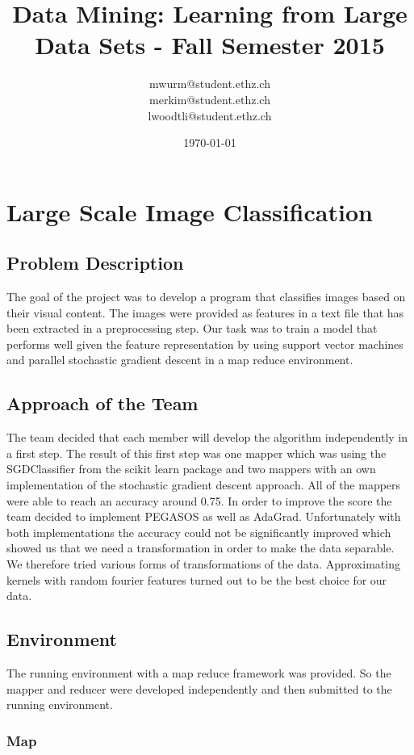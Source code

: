 \documentclass[a4paper, 11pt]{article}
\title{Data Mining: Learning from Large Data Sets - Fall Semester 2015}
\author{mwurm@student.ethz.ch\\ merkim@student.ethz.ch\\ lwoodtli@student.ethz.ch\\}
\date{\today}
\begin{document}
\maketitle

\section*{Large Scale Image Classification} 

\subsection{Problem Description}

The goal of the project was to develop a program that classifies images based on their visual content. The images were provided as features in a text file that has been extracted in a preprocessing step. Our task was to train a model that performs well given the feature representation by using support vector machines and parallel stochastic gradient descent in a map reduce environment. 

\subsection{Approach of the Team}
The team decided that each member will develop the algorithm independently in a first step. The result of this first step was one mapper which was using the SGDClassifier from the scikit learn package and two mappers with an own implementation of the stochastic gradient descent approach. All of the mappers were able to reach an accuracy around 0.75. In order to improve the score the team decided to implement PEGASOS as well as AdaGrad. Unfortunately with both implementations the accuracy could not be significantly improved which showed us that we need a transformation in order to make the data separable. We therefore tried various forms of transformations of the data. Approximating kernels with random fourier features turned out to be the best choice for our data.

\subsection{Environment}
The running environment with a map reduce framework was provided. So the mapper and reducer were developed independently and then submitted to the running environment.

\subsubsection{Map}
\end{document}
